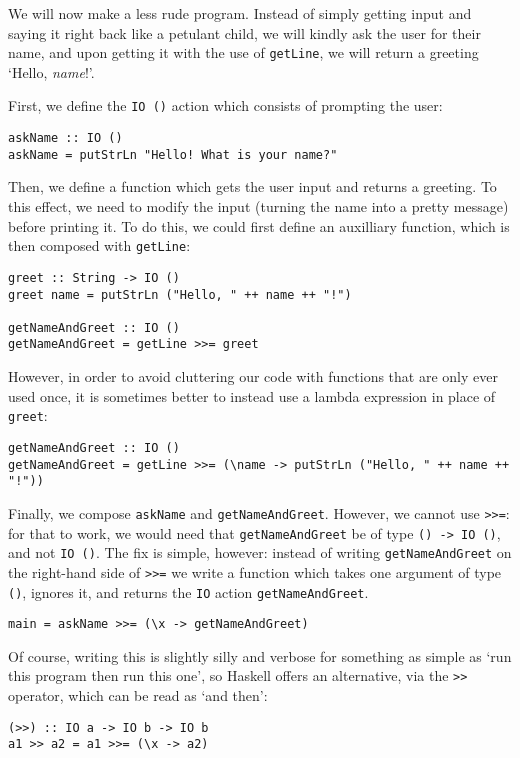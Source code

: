 \documentclass[11	pt]{article}
\theoremstyle{nonumberplain}
\newcommand*\lsin{\lstinline}
\begin{document}
We will now make a less rude program. Instead of simply getting input and saying it right back like a petulant child, we will kindly ask the user for their name, and upon getting it with the use of \lsin|getLine|, we will return a greeting `Hello, \textit{name}!'.

First, we define the \lsin|IO ()| action which consists of prompting the user:
\begin{lstlisting}
askName :: IO ()
askName = putStrLn "Hello! What is your name?"
\end{lstlisting}

Then, we define a function which gets the user input and returns a greeting. To this effect, we need to modify the input (turning the name into a pretty message) before printing it. To do this, we could first define an auxilliary function, which is then composed with \lsin|getLine|:
\begin{lstlisting}
greet :: String -> IO ()
greet name = putStrLn ("Hello, " ++ name ++ "!")

getNameAndGreet :: IO ()
getNameAndGreet = getLine >>= greet
\end{lstlisting}

However, in order to avoid cluttering our code with functions that are only ever used once, it is sometimes better to instead use a lambda expression in place of \lsin|greet|:
\begin{lstlisting}
getNameAndGreet :: IO ()
getNameAndGreet = getLine >>= (\name -> putStrLn ("Hello, " ++ name ++ "!"))
\end{lstlisting}

Finally, we compose \lsin|askName| and \lsin|getNameAndGreet|. However, we cannot use \lsin|>>=|: for that to work, we would need that \lsin|getNameAndGreet| be of type \lsin|() -> IO ()|, and not \lsin|IO ()|. The fix is simple, however: instead of writing \lsin|getNameAndGreet| on the right-hand side of \lsin|>>=| we write a function which takes one argument of type \lsin|()|, ignores it, and returns the \lsin|IO| action \lsin|getNameAndGreet|.
\begin{lstlisting}
main = askName >>= (\x -> getNameAndGreet)
\end{lstlisting}

Of course, writing this is slightly silly and verbose for something as simple as `run this program then run this one', so Haskell offers an alternative, via the \lsin|>>| operator, which can be read as `and then':
\begin{lstlisting}
(>>) :: IO a -> IO b -> IO b
a1 >> a2 = a1 >>= (\x -> a2)
\end{lstlisting}
\end{document}
